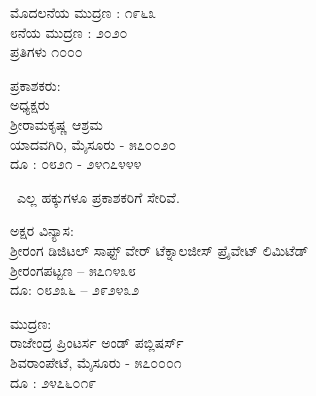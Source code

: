 \thispagestyle{empty}
\begin{flushleft}
{\fontsize{10}{12.5}\selectfont
ಮೊದಲನೆಯ ಮುದ್ರಣ : ೧೯೬೩\\
೮ನೆಯ ಮುದ್ರಣ : ೨೦೨೦\\
ಪ್ರತಿಗಳು ೧೦೦೦
\vfill

ಪ್ರಕಾಶಕರು:\\
ಅಧ್ಯಕ್ಷರು\\
ಶ‍್ರೀರಾಮಕೃಷ್ಣ ಆಶ್ರಮ\\
ಯಾದವಗಿರಿ, ಮೈಸೂರು - ೫೭೦೦೨೦\\
ದೂ : ೦೮೨೧ - ೨೪೧೭೪೪೪   
\vfill

\eng{\copyright}\ ಎಲ್ಲ ಹಕ್ಕುಗಳೂ ಪ್ರಕಾಶಕರಿಗೆ ಸೇರಿವೆ.
\vfill

ಅಕ್ಷರ ವಿನ್ಯಾಸ:\\ಶ‍್ರೀರಂಗ ಡಿಜಿಟಲ್ ಸಾಫ್ಟ್ ‍ವೇರ್ ಟೆಕ್ನಾಲಜೀಸ್ ಪ್ರೈವೇಟ್ ಲಿಮಿಟೆಡ್\\ಶ‍್ರೀರಂಗಪಟ್ಟಣ – ೫೭೧೪೩೮\\ ದೂ: ೦೮೨೩೬ – ೨೯೨೪೩೨
\vfill

ಮುದ್ರಣ:\\
ರಾಜೇಂದ್ರ ಪ್ರಿಂಟರ್ಸ ಅಂಡ್ ಪಬ್ಲಿಷರ್ಸ್ \\
ಶಿವರಾಂಪೇಟೆ, ಮೈಸೂರು - ೫೭೦೦೦೧\\
ದೂ : ೨೪೭೬೦೧೯
}
\end{flushleft}


